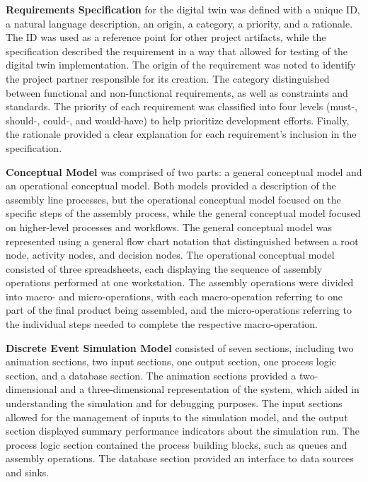 \documentclass{llncs}
\begin{document}
    \textbf{Requirements Specification} for the digital twin was defined with a unique ID, a natural language description, an origin, a category, a priority, and a rationale. The ID was used as a reference point for other project artifacts, while the specification described the requirement in a way that allowed for testing of the digital twin implementation. The origin of the requirement was noted to identify the project partner responsible for its creation. The category distinguished between functional and non-functional requirements, as well as constraints and standards. The priority of each requirement was classified into four levels 
    (must-, should-, could-, and would-have) to help prioritize development efforts. 
    Finally, the rationale provided a clear explanation for each requirement's inclusion in the specification.

    \textbf{Conceptual Model} was comprised of two parts:  a general conceptual model and an operational conceptual model. Both models provided a description of the assembly line processes, but the operational conceptual model focused on the specific steps of the assembly process, while the general conceptual model focused on higher-level processes and workflows.
    The general conceptual model was represented using a general flow chart notation that distinguished between a root node, activity nodes, and decision nodes.
    The operational conceptual model consisted of three spreadsheets, each displaying the sequence of assembly operations performed at one workstation. 
    The assembly operations were divided into macro- and micro-operations, with each macro-operation referring 
    to one part of the final product being assembled, and the micro-operations referring to the individual steps needed to complete the respective macro-operation.

    \textbf{Discrete Event Simulation Model} consisted of seven sections, including two animation sections, two input sections, one output section, one process logic section, and a database section. The animation sections provided a two-dimensional and a three-dimensional representation of the system, which aided in understanding the simulation and for debugging purposes. The input sections allowed for the management of inputs to the simulation model, and the output section displayed summary performance indicators about the simulation run. 
    The process logic section contained the process building blocks, such as queues and assembly operations. The database section provided an interface to data sources and sinks.
    
\end{document}
